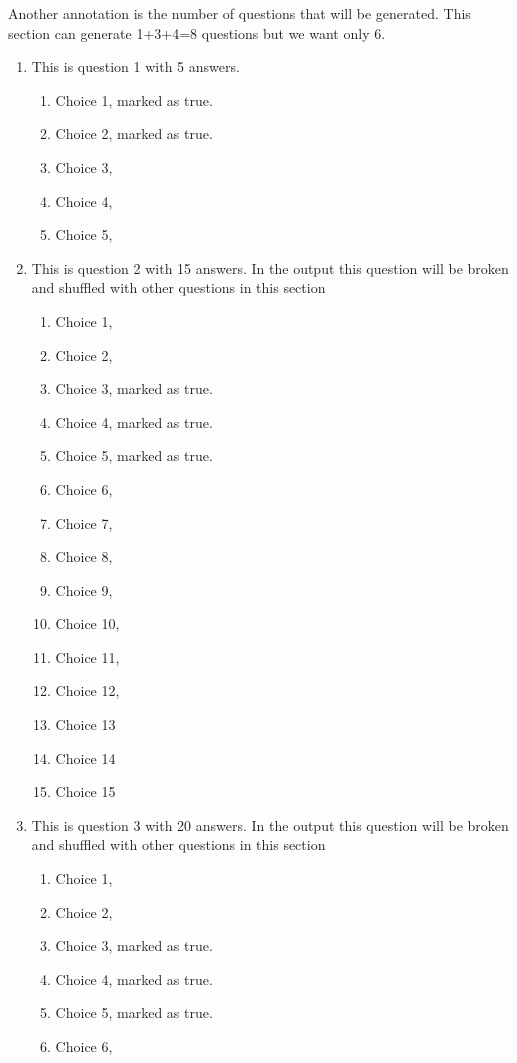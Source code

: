 \documentclass[a4paper,10pt]{article}%
\begin{document}
Another annotation is the number of questions that will be generated. This section can generate 1+3+4=8 questions but we want only 6.
\begin{enumerate}
	\item This is question 1 with 5 answers.
	\begin{enumerate}
		\item Choice 1, marked as true. %
		\item Choice 2, marked as true. %
		\item Choice 3, 
		\item Choice 4,
		\item Choice 5,
	\end{enumerate}
	\item This is question 2 with 15 answers. In the output this question will be broken and shuffled with other questions in this section
	\begin{enumerate}
		\item Choice 1,
		\item Choice 2,
		\item Choice 3, marked as true. %
		\item Choice 4, marked as true. %
		\item Choice 5, marked as true. %
		\item Choice 6,
		\item Choice 7,
		\item Choice 8,
		\item Choice 9,
		\item Choice 10,
		\item Choice 11,
		\item Choice 12,
		\item Choice 13
		\item Choice 14
		\item Choice 15
	\end{enumerate}
	\item This is question 3 with 20 answers. In the output this question will be broken and shuffled with other questions in this section
	\begin{enumerate}
		\item Choice 1,
		\item Choice 2,
		\item Choice 3, marked as true. %
		\item Choice 4, marked as true. %
		\item Choice 5, marked as true. %
		\item Choice 6,

\end{enumerate}
\end{enumerate}
\end{document}
